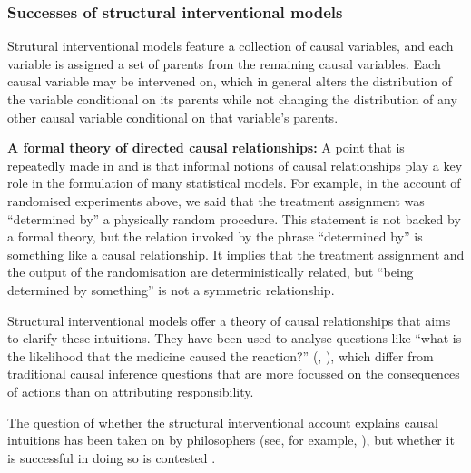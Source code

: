 \subsubsection{Successes of structural interventional models}

Strutural interventional models feature a collection of causal variables, and each variable is assigned a set of parents from the remaining causal variables. Each causal variable may be intervened on, which in general alters the distribution of the variable conditional on its parents while not changing the distribution of any other causal variable conditional on that variable's parents.

\textbf{A formal theory of directed causal relationships:} A point that is repeatedly made in \citet{pearl_causality:_2009} and \citet{pearl_book_2018} is that informal notions of causal relationships play a key role in the formulation of many statistical models. For example, in the account of randomised experiments above, we said that the treatment assignment was ``determined by'' a physically random procedure. This statement is not backed by a formal theory, but the relation invoked by the phrase ``determined by'' is something like a causal relationship. It implies that the treatment assignment and the output of the randomisation are deterministically related, but ``being determined by something'' is not a symmetric relationship.

Structural interventional models offer a theory of causal relationships that aims to clarify these intuitions. They have been used to analyse questions like ``what is the likelihood that the medicine caused the reaction?'' (\citet[ch. ~9]{pearl_causality:_2009}, \citet{pearl_causes_2015}), which differ from traditional causal inference questions that are more focussed on the consequences of actions than on attributing responsibility. 

The question of whether the structural interventional account explains causal intuitions has been taken on by philosophers (see, for example, \citet{woodward_causation_2016}), but whether it is successful in doing so is contested \citep{cartwright_modularity_2001}.

